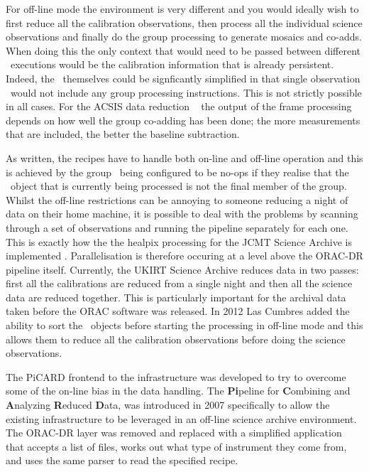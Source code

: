 \documentclass[final,authoryear,5p,times,twocolumn]{elsarticle}
\begin{document}
For off-line mode the environment is very different and you would
ideally wish to first reduce all the calibration observations, then
process all the individual science observations and finally do the
group processing to generate mosaics and co-adds. When doing this the
only context that would need to be passed between different \recipe\
executions would be the calibration information that is already
persistent. Indeed, the \recipes\ themselves could be signficantly
simplified in that single observation \recipes\ would not include any
group processing instructions. This is not strictly possible in all
cases. For the ACSIS data reduction \recipes\ \citep{JennessACSISDR}
the output of the frame processing depends on how well the group
co-adding has been done; the more measurements that are included, the
better the baseline subtraction.

As written, the recipes have to handle both on-line and off-line
operation and this is achieved by the group \primitives\ being
configured to be no-ops if they realise that the \Frame\ object that
is currently being processed is not the final member of the group.
Whilst the off-line restrictions can be annoying to someone reducing a
night of data on their home machine, it is possible to deal with the
problems by scanning through a set of observations and running the
pipeline separately for each one. This is exactly how the the healpix
processing for the JCMT Science Archive is implemented
\citep{2014SPIE9152-93}. Parallelisation is therefore occuring at a
level above the ORAC-DR pipeline itself. Currently, the UKIRT Science
Archive \citep{2014ASPC..485..143B} reduces data in two passes: first
all the calibrations are reduced from a single night and then all the
science data are reduced together. This is particularly important for
the archival data taken before the ORAC software was released.
In 2012 Las Cumbres added the ability to sort the \Group\ objects
before starting the processing in off-line mode and this allows them to
reduce all the calibration observations before doing the science
observations.

The PiCARD \citep{SUN265} frontend to the infrastructure was developed
to try to overcome some of the on-line bias in the data handling. The
\textbf{Pi}peline for \textbf{C}ombining and \textbf{A}nalyzing
\textbf{R}educed \textbf{D}ata, was introduced in 2007
\citep{2008ASPC..394..565J} specifically to allow the existing
infrastructure to be leveraged in an off-line science archive
environment. The ORAC-DR layer was removed and replaced with a
simplified application that accepts a list of files, works out what
type of instrument they come from, and uses the same parser to read
the specified recipe.
\end{document}

